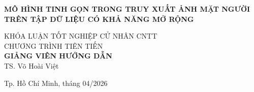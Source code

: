\begin{titlepage}
\begin{center}
{ \Large \bfseries MÔ HÌNH TINH GỌN TRONG TRUY XUẤT ẢNH MẶT NGƯỜI TRÊN TẬP DỮ LIỆU CÓ KHẢ NĂNG MỞ RỘNG \\ [2cm] } 


\large KHÓA LUẬN TỐT NGHIỆP CỬ NHÂN CNTT\\
\large CHƯƠNG TRÌNH TIÊN TIẾN\\[2cm]

\textbf{GIẢNG VIÊN HƯỚNG DẪN}\\
TS. Võ Hoài Việt\\



\vfill
Tp. Hồ Chí Minh, tháng 04/2026

\end{center}
\end{titlepage}
